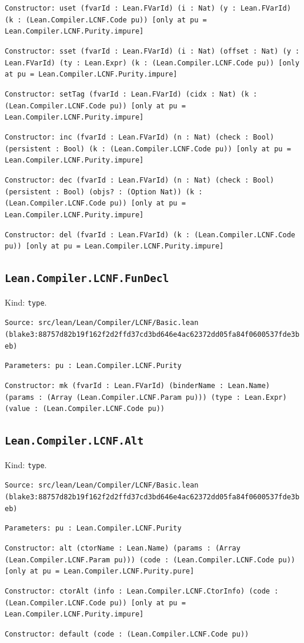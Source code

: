 \documentclass[11pt]{article}
\begin{document}
\noindent \texttt{Constructor: uset (fvarId : Lean.FVarId) (i : Nat) (y : Lean.FVarId) (k : (Lean.Compiler.LCNF.Code pu)) [only at pu = Lean.Compiler.LCNF.Purity.impure]}\par
\noindent \texttt{Constructor: sset (fvarId : Lean.FVarId) (i : Nat) (offset : Nat) (y : Lean.FVarId) (ty : Lean.Expr) (k : (Lean.Compiler.LCNF.Code pu)) [only at pu = Lean.Compiler.LCNF.Purity.impure]}\par
\noindent \texttt{Constructor: setTag (fvarId : Lean.FVarId) (cidx : Nat) (k : (Lean.Compiler.LCNF.Code pu)) [only at pu = Lean.Compiler.LCNF.Purity.impure]}\par
\noindent \texttt{Constructor: inc (fvarId : Lean.FVarId) (n : Nat) (check : Bool) (persistent : Bool) (k : (Lean.Compiler.LCNF.Code pu)) [only at pu = Lean.Compiler.LCNF.Purity.impure]}\par
\noindent \texttt{Constructor: dec (fvarId : Lean.FVarId) (n : Nat) (check : Bool) (persistent : Bool) (objs? : (Option Nat)) (k : (Lean.Compiler.LCNF.Code pu)) [only at pu = Lean.Compiler.LCNF.Purity.impure]}\par
\noindent \texttt{Constructor: del (fvarId : Lean.FVarId) (k : (Lean.Compiler.LCNF.Code pu)) [only at pu = Lean.Compiler.LCNF.Purity.impure]}\par
\subsection*{\texttt{Lean.Compiler.LCNF.FunDecl}}
\noindent Kind: \texttt{type}.\par
\noindent \texttt{Source: src/lean/Lean/Compiler/LCNF/Basic.lean (blake3:88757d82b19f162f2d2ffd37cd3bd646e4ac62372dd05fa84f0600537fde3beb)}\par
\noindent \texttt{Parameters: pu : Lean.Compiler.LCNF.Purity}\par
\noindent \texttt{Constructor: mk (fvarId : Lean.FVarId) (binderName : Lean.Name) (params : (Array (Lean.Compiler.LCNF.Param pu))) (type : Lean.Expr) (value : (Lean.Compiler.LCNF.Code pu))}\par
\subsection*{\texttt{Lean.Compiler.LCNF.Alt}}
\noindent Kind: \texttt{type}.\par
\noindent \texttt{Source: src/lean/Lean/Compiler/LCNF/Basic.lean (blake3:88757d82b19f162f2d2ffd37cd3bd646e4ac62372dd05fa84f0600537fde3beb)}\par
\noindent \texttt{Parameters: pu : Lean.Compiler.LCNF.Purity}\par
\noindent \texttt{Constructor: alt (ctorName : Lean.Name) (params : (Array (Lean.Compiler.LCNF.Param pu))) (code : (Lean.Compiler.LCNF.Code pu)) [only at pu = Lean.Compiler.LCNF.Purity.pure]}\par
\noindent \texttt{Constructor: ctorAlt (info : Lean.Compiler.LCNF.CtorInfo) (code : (Lean.Compiler.LCNF.Code pu)) [only at pu = Lean.Compiler.LCNF.Purity.impure]}\par
\noindent \texttt{Constructor: default (code : (Lean.Compiler.LCNF.Code pu))}\par
\end{document}
